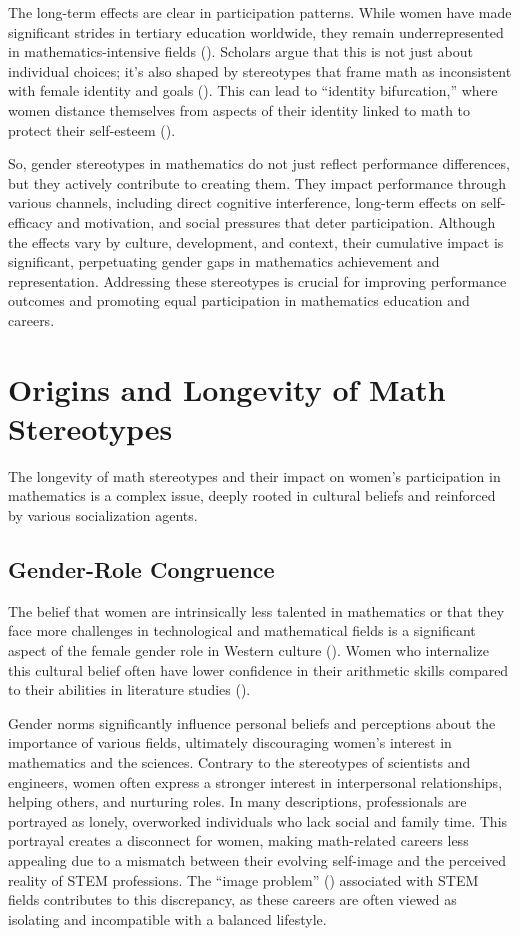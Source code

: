 The long-term effects are clear in participation patterns. While women have made significant strides in tertiary education worldwide, they remain underrepresented in mathematics-intensive fields (\cite{OWID2024,Boeren2011}). Scholars argue that this is not just about individual choices; it's also shaped by stereotypes that frame math as inconsistent with female identity and goals (\cite{eccles1989,Gilligan1993,Monteiro2023}). This can lead to “identity bifurcation,” where women distance themselves from aspects of their identity linked to math to protect their self-esteem (\cite{pro,CROCKER199989}).

So, gender stereotypes in mathematics do not just reflect performance differences, but they actively contribute to creating them. They impact performance through various channels, including direct cognitive interference, long-term effects on self-efficacy and motivation, and social pressures that deter participation. Although the effects vary by culture, development, and context, their cumulative impact is significant, perpetuating gender gaps in mathematics achievement and representation. Addressing these stereotypes is crucial for improving performance outcomes and promoting equal participation in mathematics education and careers.



\section{Origins and Longevity of Math Stereotypes}
The longevity of math stereotypes and their impact on women's participation in mathematics is a complex issue, deeply rooted in cultural beliefs and reinforced by various socialization agents.
\subsection{Gender-Role Congruence}
The belief that women are intrinsically less talented in mathematics or that they face more challenges in technological and mathematical fields is a significant aspect of the female gender role in Western culture (\cite{Tsui2007}). Women who internalize this cultural belief often have lower confidence in their arithmetic skills compared to their abilities in literature studies (\cite{Plante2009}).

Gender norms significantly influence personal beliefs and perceptions about the importance of various fields, ultimately discouraging women's interest in mathematics and the sciences. Contrary to the stereotypes of scientists and engineers, women often express a stronger interest in interpersonal relationships, helping others, and nurturing roles. In many descriptions, professionals are portrayed as lonely, overworked individuals who lack social and family time. This portrayal creates a disconnect for women, making math-related careers less appealing due to a mismatch between their evolving self-image and the perceived reality of STEM professions. The ``image problem'' (\cite{eccles1989}) associated with STEM fields contributes to this discrepancy, as these careers are often viewed as isolating and incompatible with a balanced lifestyle.

